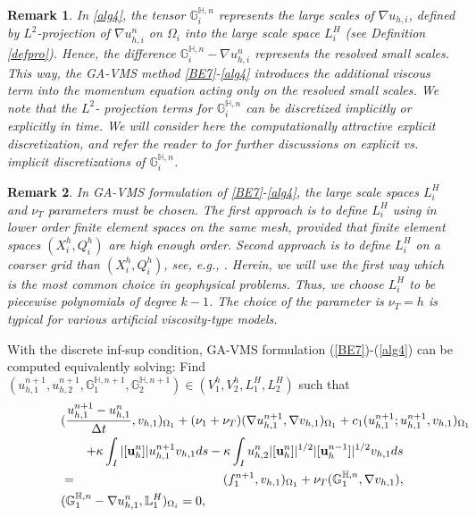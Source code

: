 \documentclass[10pt]{article}%
\numberwithin{equation}{section}
\newtheorem{remark}{Remark}[section]
\newcommand{\bff}{{  f}}
\newcommand{\bu}{{\bf u}}
\begin{document}
\begin{remark}
In \eqref{alg4}, the tensor $\mathbb{G}_i^{\mathbb{H},n}$ represents the large scales
of $\nabla u_{h,i}$, defined by $L^2$-projection of $\nabla u_{h,i}^n$ on $\Omega_i$ into the large scale space $L_i^H$ (see Definition \ref {defpro}). Hence, the difference $\mathbb{G}_i^{\mathbb{H},n}-\nabla u_{h,i}^n$  represents the resolved small scales. This way, the GA-VMS method \eqref{BE7}-\eqref{alg4} introduces the additional viscous term into the momentum equation acting only on the resolved small scales.
We note that the $L^2$- projection terms for $\mathbb{G}_i^{\mathbb{H},n}$ can be discretized implicitly or explicitly in time. We will consider here the computationally attractive explicit discretization, and refer the reader to \cite{jokaya3,JK08} for further discussions on explicit vs. implicit discretizations of $\mathbb{G}_i^{\mathbb{H},n}$.
\end{remark}
\begin{remark}
In GA-VMS formulation of \eqref{BE7}-\eqref{alg4}, the large scale spaces $ L_i^H$ and $\nu_T$ parameters must be chosen. The first approach is to define $L_i^H$  using in lower order finite element spaces on the same mesh, provided that finite element spaces $(X_{i}^h,Q_{i}^h)$ are high enough order. Second approach is to define $L_i^H$ on a coarser grid than $(X_{i}^h,Q_{i}^h)$,  see, e.g., \cite{jokaya3,JK08}.  Herein, we will use the first way  which is the most common choice in geophysical problems. Thus, we choose $ L_i^H$ to be piecewise polynomials of degree $k-1$. The choice of the parameter is $\nu_T=h$ is typical for various artificial viscosity-type models.
\end{remark}
With the discrete inf-sup condition, GA-VMS formulation (\ref{BE7})-(\ref{alg4}) can be computed equivalently solving: Find  $(u_{h,1}^{n+1},u_{h,2}^{n+1},\mathbb{G}_1^{\mathbb{H},{n+1}},\mathbb{G}_2^{\mathbb{H},{n+1}}) \in (V_1^h,V_2^h,L_1^H,L_2^H)$ such that
\begin{eqnarray}
\lefteqn{(\frac{{u^{n+1}_{h,1}}-u_{h,1}^{n}}{\Delta t} ,v_{h,1})_{\Omega_1} +(\nu_1+\nu_T)(\nabla  u_{h,1}^{n+1},\nabla v_{h,1})_{\Omega_1}+ c_1(u_{h,1}^{n+1}; u_{h,1}^{n+1},v_{h,1})_{\Omega_1}}
\nonumber\\
&&+\kappa \int_{I}|[\bu_h^n]|u_{h,1}^{n+1}v_{h,1}ds-\kappa \int_{I}u_{h,2}^n|[\bu_h^n]|^{1/2}|[\bu_h^{n-1}]|^{1/2}v_{h,1}ds\nonumber\\
&=&(\bff_1^{n+1},v_{h,1})_{\Omega_1}+\nu_T(\mathbb{G}_1^{\mathbb{H},n},\nabla v_{h,1}), \label{alg1}
\\
\lefteqn{(\mathbb{G}_1^{\mathbb{H},n}-\nabla u_{h,1}^n, \mathbb{L}_1^H)_{\Omega_i}=0, }\label{alg101}
\end{eqnarray}
\end{document}
